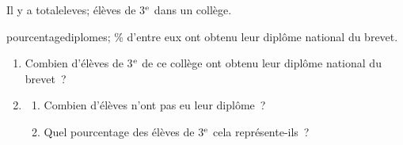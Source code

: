 \documentclass[exercice]{thedocument}%
\begin{document}
%
Il y a \<totaleleves; élèves de 3$^{\rm e}$ dans un collège.\par\noindent
\<pourcentagediplomes; \% d'entre eux ont obtenu leur diplôme national du brevet.
\begin{enumerate}
    \item Combien d'élèves de 3$^{\rm e}$ de ce collège ont obtenu leur
    diplôme national du brevet~?
    \item \begin{enumerate}
        \item Combien d'élèves n'ont pas eu leur diplôme~?
        \item Quel pourcentage des élèves de 3$^{\rm e}$ cela représente-ils~?
    \end{enumerate}
\end{enumerate}
\end{document}
